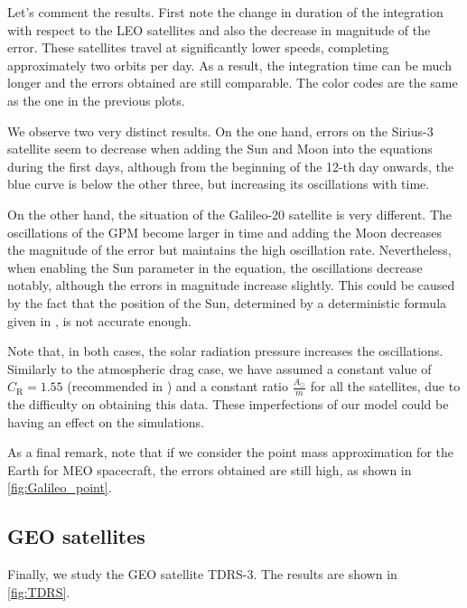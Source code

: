 \documentclass[../main.tex]{subfiles}
\begin{document}
Let's comment the results. First note the change in duration of the integration with respect to the LEO satellites and also the decrease in magnitude of the error. These satellites travel at significantly lower speeds, completing approximately two orbits per day. As a result, the integration time can be much longer and the errors obtained are still comparable. The color codes are the same as the one in the previous plots.

We observe two very distinct results. On the one hand, errors on the Sirius-3 satellite seem to decrease when adding the Sun and Moon into the equations during the first days, although from the beginning of the 12-th day onwards, the blue curve is below the other three, but increasing its oscillations with time.

On the other hand, the situation of the Galileo-20 satellite is very different. The oscillations of the GPM become larger in time and adding the Moon decreases the magnitude of the error but maintains the high oscillation rate. Nevertheless, when enabling the Sun parameter in the equation, the oscillations decrease notably, although the errors in magnitude increase slightly. This could be caused by the fact that the position of the Sun, determined by a deterministic formula given in \cite{montenbruck}, is not accurate enough.

Note that, in both cases, the solar radiation pressure increases the oscillations. Similarly to the atmospheric drag case, we have assumed a constant value of $C_\mathrm{R}=1.55$ (recommended in \cite{montenbruck}) and a constant ratio $\frac{A_\odot}{m}$ for all the satellites, due to the difficulty on obtaining this data. These imperfections of our model could be having an effect on the simulations.

As a final remark, note that if we consider the point mass approximation for the Earth for MEO spacecraft, the errors obtained are still high, as shown in \cref{fig:Galileo_point}.

\subsection{GEO satellites}
Finally, we study the GEO satellite TDRS-3. The results are shown in \cref{fig:TDRS}.
\end{document}
